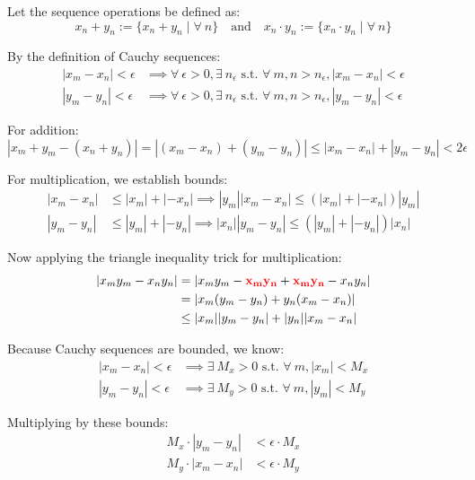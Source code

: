 
		Let the sequence operations be defined as:
		\[
			x_n + y_n := \{ x_n+y_n \mid \forall~ n \} \quad \text{and} \quad x_n \cdot y_n := \{ x_n \cdot y_n \mid \forall~ n \}
		\]

		By the definition of Cauchy sequences:
		\begin{align*}
			|x_m - x_n| < \epsilon & \implies \forall~ \epsilon>0, \exists~ n_\epsilon \text{ s.t. } \forall~ m,n > n_\epsilon, |x_m - x_n| < \epsilon \\
			|y_m - y_n| < \epsilon & \implies \forall~ \epsilon>0, \exists~ n_\epsilon \text{ s.t. } \forall~ m,n > n_\epsilon, |y_m - y_n| < \epsilon
		\end{align*}

		For addition:
		\[
			|x_m+y_m - (x_n + y_n)| = |(x_m-x_n) + (y_m-y_n)| \leq |x_m - x_n| + |y_m - y_n| < 2\epsilon
		\]

		For multiplication, we establish bounds:
		\begin{align*}
			|x_m - x_n| & \leq |x_m| + |-x_n| \implies |y_m||x_m - x_n| \leq (|x_m| + |-x_n|)|y_m| \\
			|y_m - y_n| & \leq |y_m| + |-y_n| \implies |x_n||y_m - y_n| \leq (|y_m| + |-y_n|)|x_n|
		\end{align*}

		Now applying the triangle inequality trick for multiplication:
		\begin{align*}
			|x_m y_m - x_n y_n| & = |x_m y_m - \textcolor{red}{\mathbf{x_m y_n}} + \textcolor{red}{\mathbf{x_m y_n}} - x_n y_n| \\
			                    & = |x_m(y_m-y_n) + y_n(x_m-x_n)|                                                               \\
			                    & \leq |x_m||y_m-y_n| + |y_n||x_m-x_n|
		\end{align*}

		Because Cauchy sequences are bounded, we know:
		\begin{align*}
			|x_m - x_n| < \epsilon & \implies \exists~ M_x > 0 \text{ s.t. } \forall~ m, |x_m| < M_x \\
			|y_m - y_n| < \epsilon & \implies \exists~ M_y > 0 \text{ s.t. } \forall~ m, |y_m| < M_y
		\end{align*}

		Multiplying by these bounds:
		\begin{align*}
			M_x \cdot |y_m-y_n| & < \epsilon \cdot M_x \\
			M_y \cdot |x_m-x_n| & < \epsilon \cdot M_y
		\end{align*}

